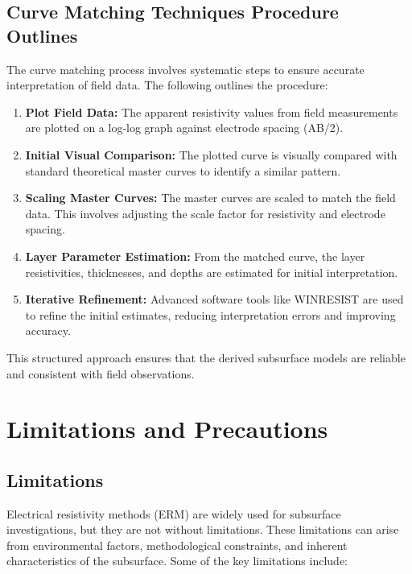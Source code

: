 \documentclass[12pt,a4paper]{report}
\begin{document}
\subsection{Curve Matching Techniques Procedure Outlines}

The curve matching process involves systematic steps to ensure accurate interpretation of field data. The following outlines the procedure:

\begin{enumerate}
    \item \textbf{Plot Field Data:} The apparent resistivity values from field measurements are plotted on a log-log graph against electrode spacing (AB/2).
    \item \textbf{Initial Visual Comparison:} The plotted curve is visually compared with standard theoretical master curves to identify a similar pattern.
    \item \textbf{Scaling Master Curves:} The master curves are scaled to match the field data. This involves adjusting the scale factor for resistivity and electrode spacing.
    \item \textbf{Layer Parameter Estimation:} From the matched curve, the layer resistivities, thicknesses, and depths are estimated for initial interpretation.
    \item \textbf{Iterative Refinement:} Advanced software tools like WINRESIST are used to refine the initial estimates, reducing interpretation errors and improving accuracy.
\end{enumerate}

This structured approach ensures that the derived subsurface models are reliable and consistent with field observations.

\section{Limitations and Precautions}

\subsection{Limitations}
Electrical resistivity methods (ERM) are widely used for subsurface investigations, but they are not without limitations. These limitations can arise from environmental factors, methodological constraints, and inherent characteristics of the subsurface. Some of the key limitations include:
\end{document}

